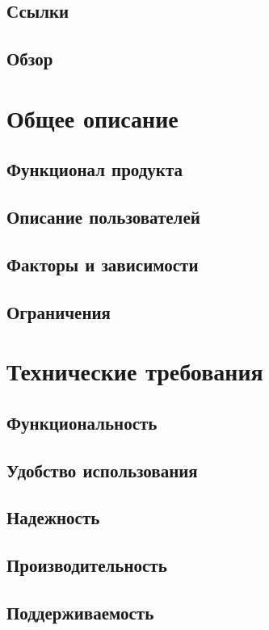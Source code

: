 \documentclass{article}
\begin{document}
  \subsection{Ссылки}
  

  \subsection{Обзор}
  

\section{Общее описание}

  \subsection{Функционал продукта}
  

  \subsection{Описание пользователей}
  

  \subsection{Факторы и зависимости}
  

  \subsection{Ограничения}
  

\section{Технические требования}

  \subsection{Функциональность}
  

  \subsection{Удобство использования}
  

  \subsection{Надежность}
  

  \subsection{Производительность}
  

  \subsection{Поддерживаемость}
  
\end{document}
